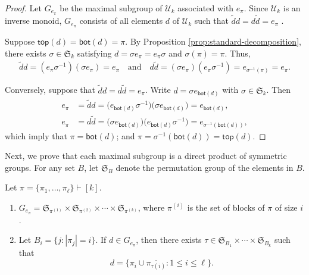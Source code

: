 \begin{proof}
    Let $G_{e_\pi}$ be the maximal subgroup of $\mathcal{U}_k$ associated with $e_\pi$.
    Since $\mathcal{U}_k$ is an inverse monoid, $G_{e_\pi}$ consists of all
    elements $d$ of $\mathcal{U}_k$ such that $\widetilde{d}d = d\widetilde{d} = e_\pi$ \cite[Corollary 3.6]{Steinberg.2016}.

    Suppose $\mathsf{top}(d) = \mathsf{bot}(d) = \pi$.
    By Proposition \ref{prop:standard-decomposition},
    there exists $\sigma \in \mathfrak{S}_k$ satisfying $d = \sigma e_\pi = e_\pi \sigma$
    and $\sigma(\pi) = \pi$. Thus,
    \begin{align*}
        \widetilde{d} d = (e_\pi \sigma^{-1}) (\sigma e_\pi) = e_\pi
        \quad\text{and}\quad
        d \widetilde{d} = (\sigma e_\pi) (e_\pi \sigma^{-1}) = e_{\sigma^{-1}(\pi)} = e_{\pi}.
    \end{align*}

    Conversely, suppose that $\widetilde{d}d = d\widetilde{d} = e_\pi$.
    Write $d = \sigma e_{\mathsf{bot}(d)}$ with $\sigma \in \mathfrak{S}_k$.
    Then
    \begin{align*}
        e_\pi & = \widetilde{d}d = \big(e_{\mathsf{bot}(d)} \sigma^{-1}\big) \big(\sigma e_{\mathsf{bot}(d)}\big) = e_{\mathsf{bot}(d)},\\
        e_\pi &= d \widetilde{d} = \big(\sigma e_{\mathsf{bot}(d)}\big) \big(e_{\mathsf{bot}(d)} \sigma^{-1}\big) = e_{\sigma^{-1}(\mathsf{bot}(d))},
    \end{align*}
    which imply that $\pi = \mathsf{bot}(d)$; and $\pi = \sigma^{-1}(\mathsf{bot}(d)) = \mathsf{top}(d)$.
\end{proof}

Next, we prove that each maximal subgroup is a direct product of symmetric groups.
For any set $B$, let $\mathfrak{S}_B$ denote the permutation group of the elements in $B$.

\begin{prop}\label{prop:structGe}
    Let $\pi = \{\pi_1, \ldots, \pi_\ell\}\vdash [k]$.
    \begin{enumerate}
        \item
            $G_{e_\pi} = \mathfrak{S}_{\pi^{(1)}} \times \mathfrak{S}_{\pi^{(2)}}
            \times \cdots \times \mathfrak{S}_{\pi^{(k)}}$,
            where $\pi^{(i)}$ is the set of blocks of $\pi$ of size $i$.

        \item
            Let $B_i=\{j : |\pi_j| = i \}$. If $d \in G_{e_{\pi}}$, then there
            exists $\tau \in \mathfrak{S}_{B_1}\times \cdots \times
            \mathfrak{S}_{B_k}$ such that
            \begin{equation*}
                d = \big\{
                    \pi_i \cup \overline{\pi_{\tau(i)}} : 1 \leqslant i \leqslant \ell
                \big\}.
            \end{equation*}
    \end{enumerate}
\end{prop}

